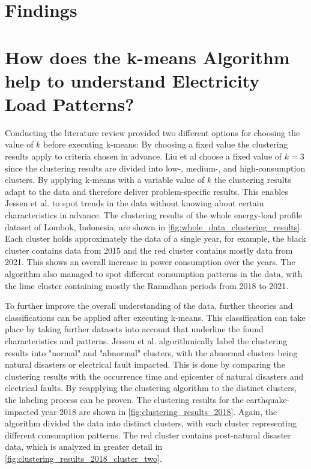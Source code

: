 \section{Findings}
\label{cha:findings}


\section{How does the k-means Algorithm help to understand Electricity Load Patterns?}
\label{sec:findings_understand_electricity_load_patterns}
Conducting the literature review provided two different options for choosing the value of $k$ before executing k-means:
By choosing a fixed value the clustering results apply to criteria chosen in advance.
Liu et al \cite{LIU-BDE} choose a fixed value of $k=3$ since the clustering results are divided into low-, medium-, and high-consumption clusters.
By applying k-means with a variable value of $k$ the clustering results adapt to the data and therefore deliver problem-specific results.
This enables Jessen et al. \cite{JES-IND} to spot trends in the data without knowing about certain characteristics in advance.
The clustering results of the whole energy-load profile dataset of Lombok, Indonesia, are shown in \ref{fig:whole_data_clustering_results}.
Each cluster holds approximately the data of a single year, for example, the black cluster contains data from 2015 and the red cluster contains mostly data from 2021.
This shows an overall increase in power consumption over the years.
The algorithm also managed to spot different consumption patterns in the data, with the lime cluster containing mostly the Ramadhan periods from 2018 to 2021.

To further improve the overall understanding of the data, further theories and classifications can be applied after executing k-means.
This classification can take place by taking further datasets into account that underline the found characteristics and patterns.
Jessen et al. \cite{JES-IND} algorithmically label the clustering results into "normal" and "abnormal" clusters, with the abnormal clusters being natural disasters or electrical fault impacted.
This is done by comparing the clustering results with the occurrence time and epicenter of natural disasters and electrical faults.
By reapplying the clustering algorithm to the distinct clusters, the labeling process can be proven.
The clustering results for the earthquake-impacted year 2018 are shown in \ref{fig:clustering_results_2018}.
Again, the algorithm divided the data into distinct clusters, with each cluster representing different consumption patterns.
The red cluster contains post-natural disaster data, which is analyzed in greater detail in \ref{fig:clustering_results_2018_cluster_two}.


